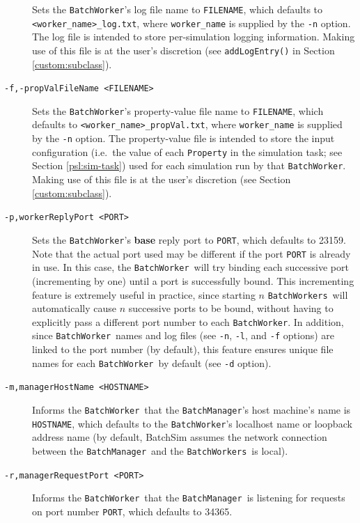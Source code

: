 \documentclass{article}
\newcommand{\BM}{{\tt BatchManager}}
\newcommand{\BW}{{\tt BatchWorker}}
\newcommand{\BWs}{{\tt BatchWorkers}}
\begin{document}
\begin{description}
Sets the \BW's log file name to {\tt FILENAME}, which defaults to {\tt <worker\_name>\_log.txt}, where {\tt worker\_name} is supplied by the {\tt -n} option. The log file is intended to store per-simulation logging information. Making use of this file is at the user's discretion (see {\tt addLogEntry()} in Section \ref{custom:subclass}).

\item[{\tt -f,-propValFileName <FILENAME>} ] \mbox{}

Sets the \BW's property-value file name to {\tt FILENAME}, which defaults to {\tt <worker\_name>\_propVal.txt}, where {\tt worker\_name} is supplied by the {\tt -n} option. The property-value file is intended to store the input configuration (i.e.\ the value of each {\tt Property} in the simulation task; see Section \ref{psl:sim-task}) used for each simulation run by that \BW. Making use of this file is at the user's discretion (see Section \ref{custom:subclass}).

\item[{\tt -p,workerReplyPort <PORT>} ] \mbox{}

Sets the \BW's \textbf{base} reply port to {\tt PORT}, which defaults to 23159. Note that the actual port used may be different if the port {\tt PORT} is already in use. In this case, the \BW\ will try binding each successive port (incrementing by one) until a port is successfully bound. This incrementing feature is extremely useful in practice, since starting $n$ \BWs\ will automatically cause $n$ successive ports to be bound, without having to explicitly pass a different port number to each \BW. In addition, since \BW\ names and log files (see {\tt -n}, {\tt -l}, and {\tt -f} options) are linked to the port number (by default), this feature ensures unique file names for each \BW\ by default (see {\tt -d} option).

\item[{\tt -m,managerHostName <HOSTNAME>} ] \mbox{}

Informs the \BW\ that the \BM's host machine's name is {\tt HOSTNAME}, which defaults to the \BW's localhost name or loopback address name (by default, BatchSim assumes the network connection between the \BM\ and the \BWs\ is local).

\item[{\tt -r,managerRequestPort <PORT>} ] \mbox{}

Informs the \BW\ that the \BM\ is listening for requests on port number {\tt PORT}, which defaults to 34365.

\end{description}
\end{document}
